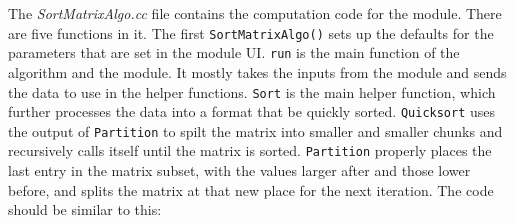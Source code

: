 \documentclass[fleqn,11pt,openany]{book}
\begin{document}
The \emph{SortMatrixAlgo.cc} file contains the computation code for the module.
There are five functions in it.
The first \verb|SortMatrixAlgo()| sets up the defaults for the parameters that are set in the module UI.
\verb|run| is the main function of the algorithm and the module.  
It mostly takes the inputs from the module and sends the data to use in the helper functions.
\verb|Sort| is the main helper function, which further processes the data into a format that be quickly sorted.  
\verb|Quicksort| uses the output of \verb|Partition| to spilt the matrix into smaller and smaller chunks and recursively calls itself until the matrix is sorted.
\verb|Partition| properly places the last entry in the matrix subset, with the values larger after and those lower before, and splits the matrix at that new place for the next iteration.  
The code should be similar to this:
\end{document}
